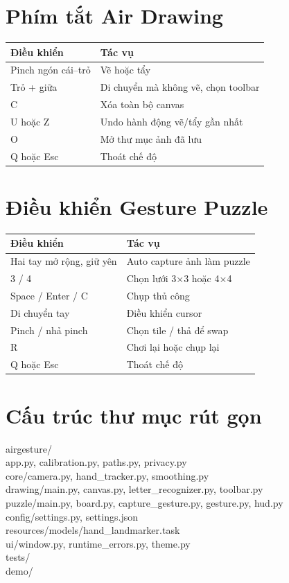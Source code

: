 \documentclass[12pt,a4paper,oneside]{report}
\begin{document}
\section{Phím tắt Air Drawing}

\begin{tabularx}{\textwidth}{L{42mm}Y}
\toprule
\textbf{Điều khiển} & \textbf{Tác vụ}\\
\midrule
Pinch ngón cái--trỏ & Vẽ hoặc tẩy\\
Trỏ + giữa & Di chuyển mà không vẽ, chọn toolbar\\
C & Xóa toàn bộ canvas\\
U hoặc Z & Undo hành động vẽ/tẩy gần nhất\\
O & Mở thư mục ảnh đã lưu\\
Q hoặc Esc & Thoát chế độ\\
\bottomrule
\end{tabularx}

\section{Điều khiển Gesture Puzzle}

\begin{tabularx}{\textwidth}{L{42mm}Y}
\toprule
\textbf{Điều khiển} & \textbf{Tác vụ}\\
\midrule
Hai tay mở rộng, giữ yên & Auto capture ảnh làm puzzle\\
3 / 4 & Chọn lưới 3$\times$3 hoặc 4$\times$4\\
Space / Enter / C & Chụp thủ công\\
Di chuyển tay & Điều khiển cursor\\
Pinch / nhả pinch & Chọn tile / thả để swap\\
R & Chơi lại hoặc chụp lại\\
Q hoặc Esc & Thoát chế độ\\
\bottomrule
\end{tabularx}

\section{Cấu trúc thư mục rút gọn}

\begin{commandbox}
airgesture/\\
\quad app.py, calibration.py, paths.py, privacy.py\\
\quad core/\quad camera.py, hand\_tracker.py, smoothing.py\\
\quad drawing/\quad main.py, canvas.py, letter\_recognizer.py, toolbar.py\\
\quad puzzle/\quad main.py, board.py, capture\_gesture.py, gesture.py, hud.py\\
\quad config/\quad settings.py, settings.json\\
\quad resources/models/\quad hand\_landmarker.task\\
\quad ui/\quad window.py, runtime\_errors.py, theme.py\\
tests/\\
demo/
\end{commandbox}
\end{document}
